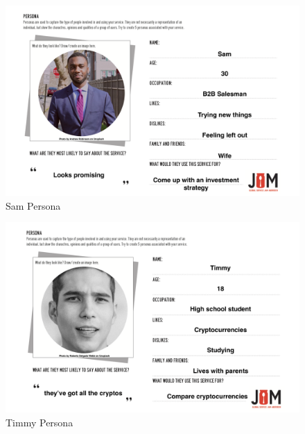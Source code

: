 \documentclass[main.tex]{subfiles}
\begin{document}
 \begin{figure}[H]
    \centering
    \includegraphics[angle=90,origin=c,width=1.1\textwidth,height=0.8\textheight]{08Appendices/085Background/085Pictures/Sam_per.png}
    \caption{Sam Persona}
 \end{figure}

 \begin{figure}[H]
    \centering
    \includegraphics[angle=90,origin=c,width=1.1\textwidth,height=0.8\textheight]{08Appendices/085Background/085Pictures/Timmy_per.png}
    \caption{Timmy Persona}
 \end{figure}
\end{document}

